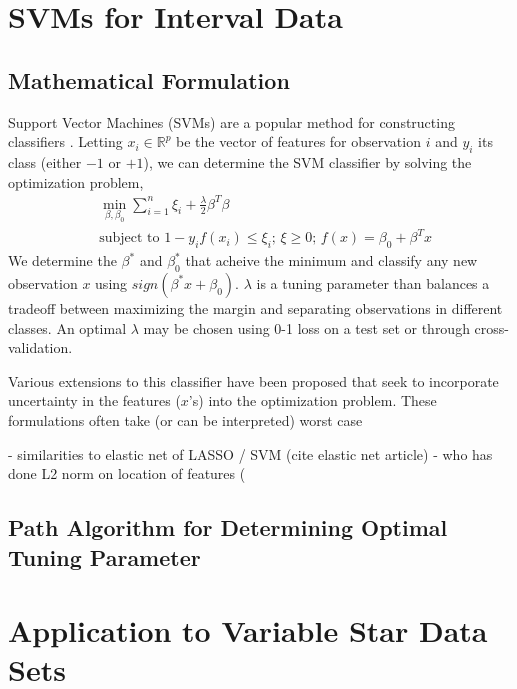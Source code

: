 \documentclass[11pt]{article}
\begin{document}

\section{SVMs for Interval Data}
\subsection{Mathematical Formulation}

Support Vector Machines (SVMs) are a popular method for constructing classifiers \cite{scholkopf2002learning}. Letting $x_i \in \mathbb{R}^p$ be the vector of features for observation $i$ and $y_i$ its class (either $-1$ or $+1$), we can determine the SVM classifier by solving the optimization problem,
\begin{align}
\label{eq:dual}
& \min_{\beta,\beta_0}  \sum_{i=1}^n \xi_i + \frac{\lambda}{2}\beta^T\beta\\
& \text{subject to }  1 - y_if(x_i) \leq \xi_i; \, \xi \geq 0; \, f(x) = \beta_0 + \beta^Tx \nonumber
\end{align}
We determine the $\beta^*$ and $\beta_0^*$ that acheive the minimum and classify any new observation $x$ using $sign(\beta^* x + \beta_0)$. $\lambda$ is a tuning parameter than balances a tradeoff between maximizing the margin and separating observations in different classes. An optimal $\lambda$ may be chosen using 0-1 loss on a test set or through cross-validation.

Various extensions to this classifier have been proposed that seek to incorporate uncertainty in the features ($x$'s) into the optimization problem. These formulations often take (or can be interpreted) worst case 

- similarities to elastic net of LASSO / SVM (cite elastic net article)
- who has done L2 norm on location of features (

\subsection{Path Algorithm for Determining Optimal Tuning Parameter}

\section{Application to Variable Star Data Sets}
\end{document}
